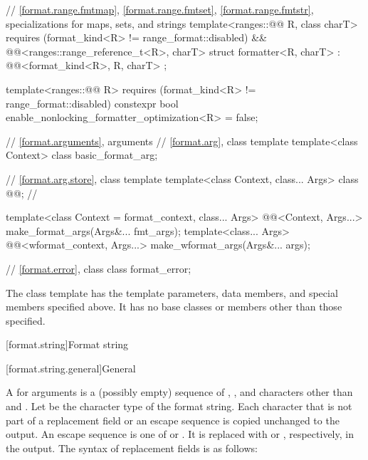 \begin{codeblock}
{  // \ref{format.range.fmtmap}, \ref{format.range.fmtset}, \ref{format.range.fmtstr}, specializations for maps, sets, and strings
  template<ranges::@@ R, class charT>
    requires (format_kind<R> != range_format::disabled) &&
             @@<ranges::range_reference_t<R>, charT>
  struct formatter<R, charT> : @@<format_kind<R>, R, charT> { };

  template<ranges::@@ R>
    requires (format_kind<R> != range_format::disabled)
    constexpr bool enable_nonlocking_formatter_optimization<R> = false;

  // \ref{format.arguments}, arguments
  // \ref{format.arg}, class template 
  template<class Context> class basic_format_arg;

  // \ref{format.arg.store}, class template 
  template<class Context, class... Args> class @@;        // \expos

  template<class Context = format_context, class... Args>
    @@<Context, Args...>
      make_format_args(Args&... fmt_args);
  template<class... Args>
    @@<wformat_context, Args...>
      make_wformat_args(Args&... args);

  // \ref{format.error}, class 
  class format_error;
}
\end{codeblock}


\pnum
The class template 
has the template parameters, data members, and special members specified above. It has no base classes or members other than those specified.

[format.string]{Format string}

[format.string.general]{General}

\pnum
A  for arguments  is
a (possibly empty) sequence of
,
,
and characters other than \tcode{\{} and \tcode{\}}.
Let  be the character type of the format string.
Each character that is not part of
a replacement field or an escape sequence
is copied unchanged to the output.
An escape sequence is one of \tcode{\{\{} or \tcode{\}\}}.
It is replaced with \tcode{\{} or \tcode{\}}, respectively, in the output.
The syntax of replacement fields is as follows:

